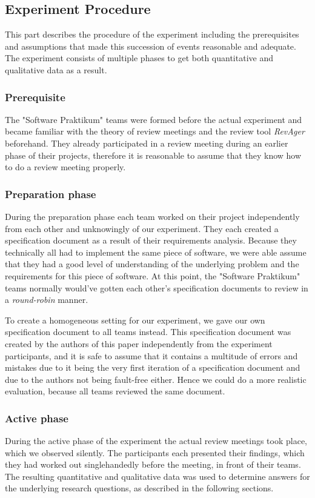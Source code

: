 \subsection{Experiment Procedure}
This part describes the procedure of the experiment including the prerequisites and assumptions that made this succession of events  reasonable and adequate.
The experiment consists of multiple phases to get both quantitative and qualitative data as a result.
\subsubsection{Prerequisite}
The "Software Praktikum" teams were formed before the actual experiment and became familiar with the theory of review meetings and the review tool \textit{RevAger} beforehand.
They already participated in a review meeting during an earlier phase of their projects, therefore it is reasonable to assume that they know how to do a review meeting properly.
\subsubsection{Preparation phase}
During the preparation phase each team worked on their project independently from each other and unknowingly of our experiment.
They each created a specification document as a result of their requirements analysis.
Because they technically all had to implement the same piece of software, we were able assume that they had a good level of understanding of the underlying problem and the requirements for this piece of software.
At this point, the "Software Praktikum" teams normally would've gotten each other's specification documents to review in a \textit{round-robin} manner.

To create a homogeneous setting for our experiment, we gave our own specification document to all teams instead.
This specification document was created by the authors of this paper independently from the experiment participants, and it is safe to assume that it contains a multitude of errors and mistakes due to it being the very first iteration of a specification document and due to the authors not being fault-free either.
Hence we could do a more realistic evaluation, because all teams reviewed the same document.
\subsubsection{Active phase}
During the active phase of the experiment the actual review meetings took place, which we observed silently.
The participants each presented their findings, which they had worked out singlehandedly before the meeting, in front of their teams.
The resulting quantitative and qualitative data was used to determine answers for the underlying research questions, as described in the following sections.
